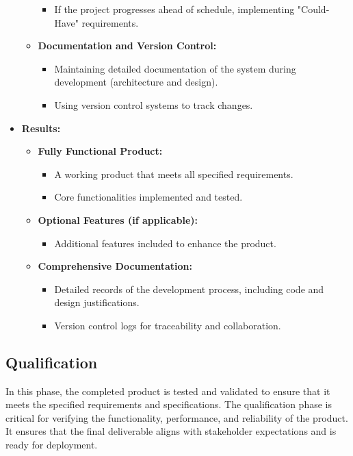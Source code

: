 \documentclass{article}
\begin{document}
\begin{itemize}[leftmargin=*, label={}]
\begin{itemize}
\begin{itemize}
                    \item If the project progresses ahead of schedule, implementing "Could-Have" requirements.
                \end{itemize}
            \item \textbf{Documentation and Version Control:}
                \begin{itemize}
                    \item Maintaining detailed documentation of the system during development (architecture and design).
                    \item Using version control systems to track changes.
                \end{itemize}
        \end{itemize}

    \item \textbf{Results:}
        \begin{itemize}
            \item \textbf{Fully Functional Product:}
                \begin{itemize}
                    \item A working product that meets all specified requirements.
                    \item Core functionalities implemented and tested.
                \end{itemize}
            \item \textbf{Optional Features (if applicable):}
                \begin{itemize}
                    \item Additional features included to enhance the product.
                \end{itemize}
            \item \textbf{Comprehensive Documentation:}
                \begin{itemize}
                    \item Detailed records of the development process, including code and design justifications.
                    \item Version control logs for traceability and collaboration.
                \end{itemize}
        \end{itemize}
\end{itemize}

\subsection{Qualification}
In this phase, the completed product is tested and validated to ensure that it meets the specified requirements and specifications. The qualification phase is critical for verifying the functionality, performance, and reliability of the product. It ensures that the final deliverable aligns with stakeholder expectations and is ready for deployment.
\end{document}
